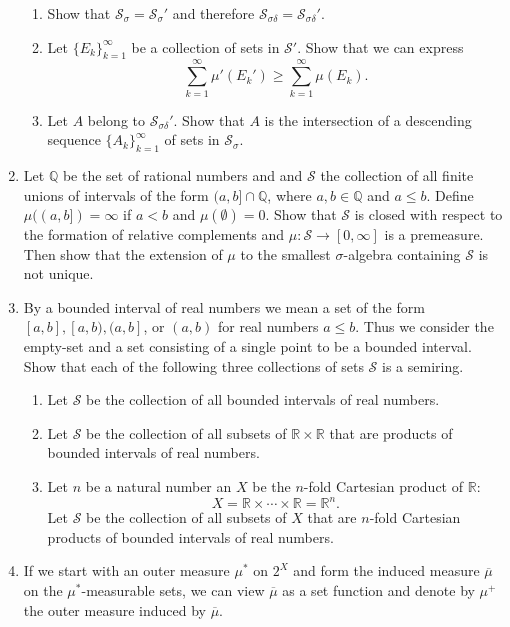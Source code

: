 \begin{enumerate}
\begin{enumerate}[label=(\roman*),align=left]
		\item Show that $\mathcal{S}_\sigma=\mathcal{S}_\sigma'$ and therefore $\mathcal{S}_{\sigma\delta}=\mathcal{S}_{\sigma\delta}'$.
		\item Let $\{E_k\}_{k=1}^\infty$ be a collection of sets in $\mathcal{S}'$. Show that we can express 
		\[
			\sum_{k=1}^\infty \mu'(E_k')\ge\sum_{k=1}^\infty \mu(E_k).
		\]
		\item Let $A$ belong to $\mathcal{S}_{\sigma\delta}'$. Show that $A$ is the intersection of a descending sequence $\{A_k\}_{k=1}^\infty$ of sets in $\mathcal{S}_\sigma$.
	\end{enumerate}
	\item Let $\mathbb{Q}$ be the set of rational numbers and and $\mathcal{S}$ the collection of all finite unions of intervals of the form $(a,b]\cap\mathbb{Q}$, where $a,b\in\mathbb{Q}$ and $a\le b$. 
	Define $\mu((a,b])=\infty$ if $a<b$ and $\mu(\emptyset)=0$.
	Show that $\mathcal{S}$ is closed with respect to the formation of relative complements and $\mu:\mathcal{S}\to[0,\infty]$ is a premeasure.
	Then show that the extension of $\mu$ to the smallest $\sigma$-algebra containing $\mathcal{S}$ is not unique.
	\item By a bounded interval of real numbers we mean a set of the form $[a,b],[a,b),(a,b]$, or $(a,b)$ for real numbers $a\le b$.
	Thus we consider the empty-set and a set consisting of a single point to be a bounded interval.
	Show that each of the following three collections of sets $\mathcal{S}$ is a semiring.
	\begin{enumerate}[label=(\roman*),align=left]  
		\item Let $\mathcal{S}$ be the collection of all bounded intervals of real numbers.
		\item Let $\mathcal{S}$ be the collection of all subsets of $\mathbb{R}\times\mathbb{R}$ that are products of bounded intervals of real numbers.
		\item Let $n$ be a natural number an $X$ be the $n$-fold Cartesian product of $\mathbb{R}$:
		\[
			X=\mathbb{R}\times\cdots\times\mathbb{R}=\mathbb{R}^n.
		\]
		Let $\mathcal{S}$ be the collection of all subsets of $X$ that are $n$-fold Cartesian products of bounded intervals of real numbers.
	\end{enumerate}
	\item If we start with an outer measure $\mu^*$ on $2^X$ and form the induced measure $\overline\mu$ on the $\mu^*$-measurable sets, we can view $\overline\mu$ as a set function and denote by $\mu^+$ the outer measure induced by $\overline\mu$.

\end{enumerate}
